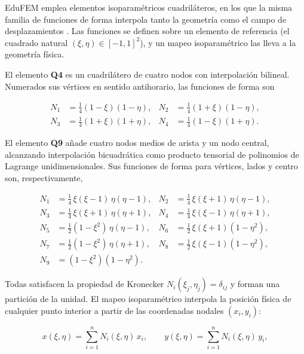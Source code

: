 EduFEM emplea elementos isoparamétricos cuadriláteros, en los que la misma familia de funciones de forma interpola tanto la geometría como el campo de desplazamientos \autocite{bathe2014fem,onate2009structural}. Las funciones se definen sobre un elemento de referencia (el cuadrado natural $(\xi, \eta) \in [-1, 1]^2$), y un mapeo isoparamétrico las lleva a la geometría física.

El elemento \textbf{Q4} es un cuadrilátero de cuatro nodos con interpolación bilineal. Numerados sus vértices en sentido antihorario, las funciones de forma son

\begin{equation}
\begin{aligned}
N_1 &= \tfrac{1}{4}(1-\xi)(1-\eta), & N_2 &= \tfrac{1}{4}(1+\xi)(1-\eta), \\
N_3 &= \tfrac{1}{4}(1+\xi)(1+\eta), & N_4 &= \tfrac{1}{4}(1-\xi)(1+\eta).
\end{aligned}
\label{eq:N-q4}
\end{equation}

El elemento \textbf{Q9} añade cuatro nodos medios de arista y un nodo central, alcanzando interpolación bicuadrática como producto tensorial de polinomios de Lagrange unidimensionales. Sus funciones de forma para vértices, lados y centro son, respectivamente,

\begin{equation}
\begin{aligned}
N_1 &= \tfrac{1}{4}\,\xi(\xi-1)\,\eta(\eta-1), & N_2 &= \tfrac{1}{4}\,\xi(\xi+1)\,\eta(\eta-1), \\
N_3 &= \tfrac{1}{4}\,\xi(\xi+1)\,\eta(\eta+1), & N_4 &= \tfrac{1}{4}\,\xi(\xi-1)\,\eta(\eta+1), \\
N_5 &= \tfrac{1}{2}(1-\xi^2)\,\eta(\eta-1), & N_6 &= \tfrac{1}{2}\,\xi(\xi+1)(1-\eta^2), \\
N_7 &= \tfrac{1}{2}(1-\xi^2)\,\eta(\eta+1), & N_8 &= \tfrac{1}{2}\,\xi(\xi-1)(1-\eta^2), \\
N_9 &= (1-\xi^2)(1-\eta^2). &&
\end{aligned}
\label{eq:N-q9}
\end{equation}

Todas satisfacen la propiedad de Kronecker $N_i(\xi_j, \eta_j) = \delta_{ij}$ y forman una partición de la unidad. El mapeo isoparamétrico interpola la posición física de cualquier punto interior a partir de las coordenadas nodales $(x_i, y_i)$:

\begin{equation}
x(\xi, \eta) = \sum_{i=1}^{n} N_i(\xi, \eta)\,x_i, \qquad
y(\xi, \eta) = \sum_{i=1}^{n} N_i(\xi, \eta)\,y_i,
\label{eq:mapeo-iso}
\end{equation}

